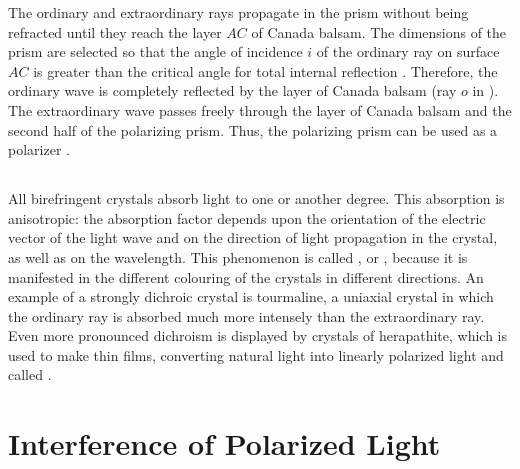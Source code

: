 The ordinary and extraordinary rays propagate in the prism without being refracted until they reach the layer $AC$ of Canada balsam. The dimensions of the prism are selected so that the angle of incidence $i$ of the ordinary ray on surface $AC$ is greater than the critical angle for total internal reflection . Therefore, the ordinary wave is completely reflected by the layer of Canada balsam (ray $o$ in ). The extraordinary wave passes freely through the layer of Canada balsam and the second half of the polarizing prism. Thus, the polarizing prism can be used as a
polarizer .

\subsection{}\label{35.2.10} All birefringent crystals absorb light to one or another degree. This absorption is anisotropic: the absorption factor  depends upon the orientation of the electric vector of the light wave and on the direction of light propagation in the crystal, as well as on the wavelength. This phenomenon is called , or , because it is manifested in the different colouring of the crystals in different directions. An example of a strongly dichroic crystal is tourmaline, a uniaxial crystal in which the ordinary ray is absorbed much more intensely than the extraordinary ray. Even more pronounced dichroism is displayed by crystals of herapathite, which is used to make thin films, converting natural light into linearly polarized light and called .

\section{Interference of Polarized Light}
\label{sec-35.3} 


